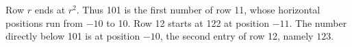 Row $r$ ends at $r^2$. Thus 101 is the first number of row 11, whose horizontal positions run from $-10$ to 10. Row 12 starts at 122 at position $-11$. The number directly below 101 is at position $-10$, the second entry of row 12, namely $\boxed{123}$.

